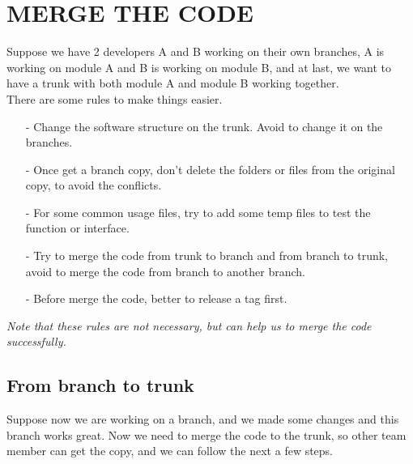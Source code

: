 \section{MERGE THE CODE}
Suppose we have 2 developers A and B working on their own branches, A is working on module A and B is working on module B, and at last, we want to have a trunk with both module A and module B working together.\\
There are some rules to make things easier.
\begin{itemize}
\item[-] Change the software structure on the trunk. Avoid to change it on the branches.
\item[-] Once get a branch copy, don't delete the folders or files from the original copy, to avoid the conflicts.
\item[-] For some common usage files, try to add some temp files to test the function or interface.
\item[-] Try to merge the code from trunk to branch and from branch to trunk, avoid to merge the code from branch to another branch.
\item[-] Before merge the code, better to release a tag first.
\end{itemize}
\textit{Note that these rules are not necessary, but can help us to merge the code successfully.}


\subsection{From branch to trunk}
Suppose now we are working on a branch, and we made some changes and this branch works great. Now we need to merge the code to the trunk, so other team member can get the copy, and we can follow the next a few steps.

